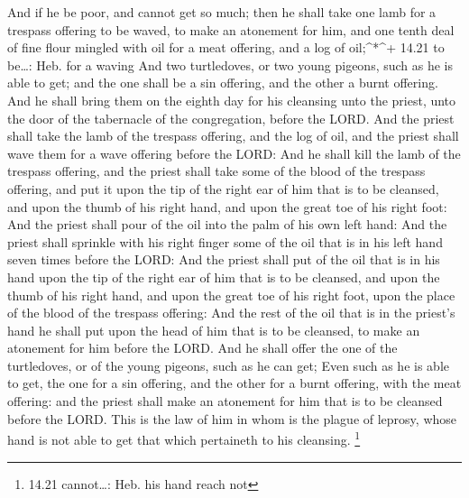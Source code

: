  And if he be poor, and cannot get so much; then he shall
take one lamb for a trespass offering to be waved, to make an atonement
for him, and one tenth deal of fine flour mingled with oil for a meat
offering, and a log of oil;\^{}*\^{}+ 14.21 to be\ldots: Heb. for a
waving  And two turtledoves, or two young pigeons, such as
he is able to get; and the one shall be a sin offering, and the other a
burnt offering.  And he shall bring them on the eighth day
for his cleansing unto the priest, unto the door of the tabernacle of
the congregation, before the LORD.  And the priest shall
take the lamb of the trespass offering, and the log of oil, and the
priest shall wave them for a wave offering before the LORD:
 And he shall kill the lamb of the trespass offering, and
the priest shall take some of the blood of the trespass offering, and
put it upon the tip of the right ear of him that is to be cleansed, and
upon the thumb of his right hand, and upon the great toe of his right
foot:  And the priest shall pour of the oil into the palm
of his own left hand:  And the priest shall sprinkle with
his right finger some of the oil that is in his left hand seven times
before the LORD:  And the priest shall put of the oil that
is in his hand upon the tip of the right ear of him that is to be
cleansed, and upon the thumb of his right hand, and upon the great toe
of his right foot, upon the place of the blood of the trespass offering:
 And the rest of the oil that is in the priest's hand he
shall put upon the head of him that is to be cleansed, to make an
atonement for him before the LORD.  And he shall offer the
one of the turtledoves, or of the young pigeons, such as he can get;
 Even such as he is able to get, the one for a sin
offering, and the other for a burnt offering, with the meat offering:
and the priest shall make an atonement for him that is to be cleansed
before the LORD.  This is the law of him in whom is the
plague of leprosy, whose hand is not able to get that which pertaineth
to his cleansing. \footnote{14.21 cannot\ldots: Heb. his hand reach not}

